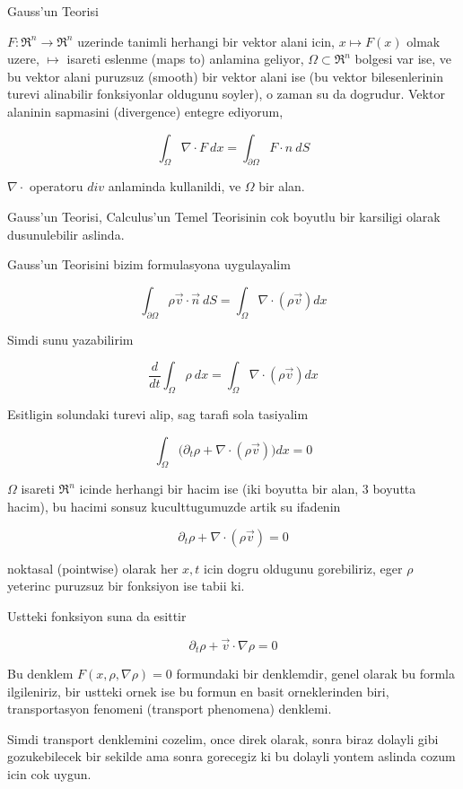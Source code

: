 \documentclass[12pt,fleqn]{article}
\begin{document}
Gauss'un Teorisi

$F: \Re^n \to \Re^n$ uzerinde tanimli herhangi bir vektor alani icin,
$x
\mapsto F(x)$ olmak uzere, $\mapsto$ isareti eslenme (maps to) anlamina
geliyor, $\Omega \subset \Re^n$ bolgesi var ise, ve bu vektor alani
puruzsuz (smooth) bir vektor alani ise (bu vektor bilesenlerinin
turevi alinabilir fonksiyonlar oldugunu soyler), o zaman su da
dogrudur. Vektor alaninin sapmasini (divergence) entegre ediyorum, 

\[ 
\int_\Omega \nabla \cdot F \ dx =
\int_{\partial \Omega} F \cdot n \ dS
\]


$\nabla \cdot$ operatoru $div$ anlaminda kullanildi, ve $\Omega$ bir alan. 

Gauss'un Teorisi, Calculus'un Temel Teorisinin cok boyutlu bir karsiligi
olarak dusunulebilir aslinda.

Gauss'un Teorisini bizim formulasyona uygulayalim

\[ \int_{\partial \Omega} \rho \vec{v} \cdot \vec{n} \ dS =
\int_\Omega \nabla \cdot (\rho \vec{v}) dx 
\]

Simdi sunu yazabilirim

\[ \frac{d}{dt} \int_\Omega \rho \ dx = 
\int_\Omega \nabla \cdot (\rho \vec{v}) dx
 \]

Esitligin solundaki turevi alip, sag tarafi sola tasiyalim

\[ \int_\Omega \bigg( 
\partial_t \rho + \nabla \cdot (\rho \vec{v}) 
\bigg)dx = 0
 \]

$\Omega$ isareti $\Re^n$ icinde herhangi bir hacim ise (iki boyutta bir
alan, 3 boyutta hacim), bu hacimi sonsuz kuculttugumuzde artik su ifadenin 

\[ \partial_t \rho + \nabla \cdot (\rho \vec{v})  = 0 \]

noktasal (pointwise) olarak her $x,t$ icin dogru oldugunu gorebiliriz, eger
$\rho$ yeterinc puruzsuz bir fonksiyon ise tabii ki. 

Ustteki fonksiyon suna da esittir

\[ \partial_t \rho + \vec{v} \cdot \nabla \rho = 0\]

Bu denklem $F(x,\rho,\nabla \rho)=0$ formundaki bir denklemdir, genel
olarak bu formla ilgileniriz, bir ustteki ornek ise bu formun en basit
orneklerinden biri, transportasyon fenomeni (transport phenomena) denklemi.

Simdi transport denklemini cozelim, once direk olarak, sonra biraz dolayli
gibi gozukebilecek bir sekilde ama sonra gorecegiz ki bu dolayli yontem
aslinda cozum icin cok uygun. 
\end{document}

